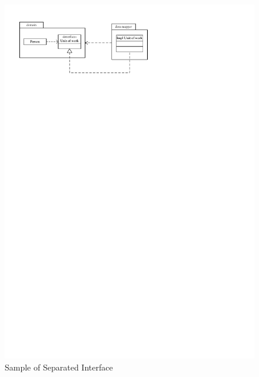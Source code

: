 			\begin{figure}[htb]
				\begin{center}
					\includegraphics{./files/inc/figures/patternsSeparatedInterface}
					\caption{\label{fig:patternsSeparatedInterface} Sample of Separated Interface}
				\end{center}
			\end{figure}
